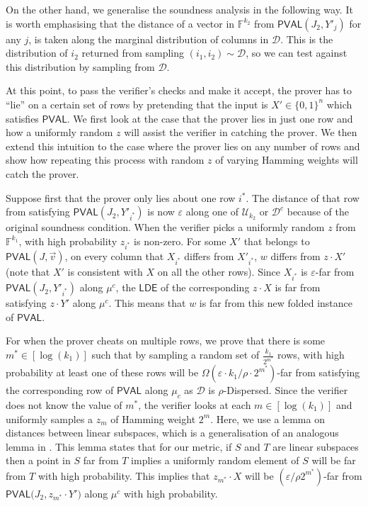 \documentclass[10pt,a4paper]{article}
\newcommand{\PVAL}{\mathsf{PVAL}}
\newcommand{\LDE}{\mathsf{LDE}}
\newcommand{\sD}{\mathcal{D}}
\begin{document}
On the other hand, we generalise the soundness analysis in the following way. It is worth emphasising that the distance of a vector in $\mathbb{F}^{k_{2}}$ from $\PVAL(J_2,Y'_j)$ for any $j$, is taken along the marginal distribution of columns in $\mathcal{D}$. This is the distribution of $i_{2}$ returned from sampling $(i_{1}, i_{2})\sim \mathcal{D}$, so we can test against this distribution by sampling from $\mathcal{D}$.

At this point, to pass the verifier's checks and make it accept, the prover has to ``lie'' on a certain set of rows by pretending that the input is 
$X'\in \{0,1\}^{n}$ which satisfies $\PVAL$. We first look at the case that the prover lies in just one row and how a uniformly random $z$ will assist the verifier in catching the prover. We then extend this intuition to the case where the prover lies on any number of rows and show how repeating this process with random $z$ of varying Hamming weights will catch the prover.

Suppose first that the prover only lies about one row $i^{\ast}$. The distance of that row from satisfying $\PVAL(J_2,Y'_{i^\ast})$ is now $\varepsilon$ along one of $\mathcal{U}_{k_{2}}$ or $\mathcal{D}^{c}$ because of the original soundness condition. When the verifier picks a uniformly random $z$ from $\mathbb{F}^{k_{1}}$, with high probability $z_{i^{\ast}}$ is non-zero. For some $X'$ that belongs to $\PVAL(J,\vec{v})$, on every column that $X_{i^{\ast}}$ differs from $X'_{i^{\ast}}$, $w$ differs from $z \cdot X'$ (note that $X'$ is consistent with $X$ on all the other rows). Since $X_{i^{\ast}}$ is $\varepsilon$-far from $\PVAL({J_2,Y'_{i^\ast}})$ along $\mu^{c}$, the $\LDE$ of the corresponding $z \cdot X$ is far from satisfying $z\cdot Y'$  along $\mu^{c}$. This means that $w$ is far from this new folded instance of $\PVAL$.

For when the prover cheats on multiple rows, we prove that there is some $m^{\ast}\in [\log (k_{1})]$ such that by sampling a random set of $\frac{k_{1}}{2^{m^*}}$ rows, with high probability at least one of these rows will be $\Omega(\varepsilon\cdot k_{1}/\rho \cdot 2^{m^{\ast}})$-far from satisfying the corresponding row of $\PVAL$ along $\mu_{c}$ as $\sD$ is $\rho$-Dispersed. Since the verifier does not know the value of $m^{\ast}$, the verifier looks at each $m\in [\log (k_{1})]$ and uniformly samples a $z_{m}$ of Hamming weight $2^{m}$. Here, we use a lemma on distances between linear subspaces, which is a generalisation of an analogous lemma in \cite{RVW}. This lemma states that for our metric, if $S$ and $T$ are linear subspaces then a point in $S$ far from $T$ implies a uniformly random element of $S$ will be far from $T$ with high probability. This implies that $z_{m^{\ast}}\cdot X$ will be $(\varepsilon/\rho 2^{m^{\ast}})$-far from $\PVAL\bigg(J_{2}, z_{m^{\ast}}\cdot Y'\bigg)$ along $\mu^{c}$ with high probability. 
\end{document}

